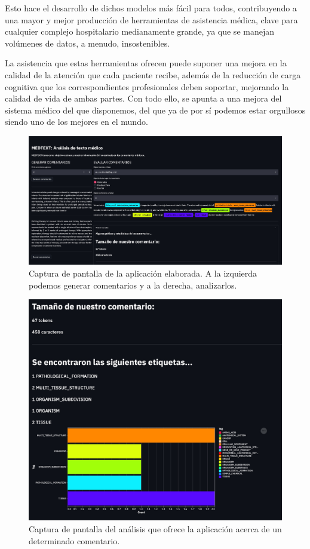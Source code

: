 Esto hace el desarrollo de dichos modelos más fácil para todos, contribuyendo a una mayor y mejor producción de herramientas de asistencia médica, clave para cualquier complejo hospitalario medianamente grande, ya que se manejan volúmenes de datos, a menudo, insostenibles.

La asistencia que estas herramientas ofrecen puede suponer una mejora en la calidad de la atención que cada paciente recibe, además de la reducción de carga cognitiva que los correspondientes profesionales deben soportar, mejorando la calidad de vida de ambas partes. Con todo ello, se apunta a una mejora del sistema médico del que disponemos, del que ya de por sí podemos estar orgullosos siendo uno de los mejores en el mundo.

\begin{figure}[h]
	\centering
	\includegraphics[width=.9\textwidth]{media/app_demo.jpeg}
	\caption{Captura de pantalla de la aplicación elaborada. A la izquierda podemos generar comentarios y a la derecha, analizarlos.}
	\label{fig:app-demo}
\end{figure}


\begin{figure}[h]
	\centering
	\includegraphics[width=.62\textwidth]{media/analysis_comment.jpeg}
	\caption{Captura de pantalla del análisis que ofrece la aplicación acerca de un determinado comentario.}
	\label{fig:analysis-comment}
\end{figure}







